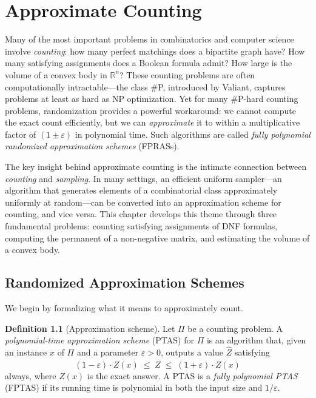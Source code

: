 \documentclass[twoside,12pt]{book}
\theoremstyle{plain}
\theoremstyle{definition}
\newtheorem{definition}[theorem]{Definition}
\theoremstyle{remark}
\begin{document}
\chapter{Approximate Counting}
\label{ch:approximate-counting}

Many of the most important problems in combinatorics and computer science involve \emph{counting}: how many perfect matchings does a bipartite graph have? How many satisfying assignments does a Boolean formula admit? How large is the volume of a convex body in $\mathbb{R}^n$? These counting problems are often computationally intractable---the class \#P, introduced by Valiant, captures problems at least as hard as NP optimization. Yet for many \#P-hard counting problems, randomization provides a powerful workaround: we cannot compute the exact count efficiently, but we can \emph{approximate} it to within a multiplicative factor of $(1 \pm \varepsilon)$ in polynomial time. Such algorithms are called \emph{fully polynomial randomized approximation schemes} (FPRASs).

The key insight behind approximate counting is the intimate connection between \emph{counting} and \emph{sampling}. In many settings, an efficient uniform sampler---an algorithm that generates elements of a combinatorial class approximately uniformly at random---can be converted into an approximation scheme for counting, and vice versa. This chapter develops this theme through three fundamental problems: counting satisfying assignments of DNF formulas, computing the permanent of a non-negative matrix, and estimating the volume of a convex body.

\section{Randomized Approximation Schemes}
\label{sec:approx-schemes}

We begin by formalizing what it means to approximately count.

\begin{definition}[Approximation scheme]
Let $\Pi$ be a counting problem. A \emph{polynomial-time approximation scheme} (PTAS) for $\Pi$ is an algorithm that, given an instance $x$ of $\Pi$ and a parameter $\varepsilon > 0$, outputs a value $\hat{Z}$ satisfying
\[
(1 - \varepsilon) \cdot Z(x) \;\leq\; \hat{Z} \;\leq\; (1 + \varepsilon) \cdot Z(x)
\]
always, where $Z(x)$ is the exact answer. A PTAS is a \emph{fully polynomial PTAS} (FPTAS) if its running time is polynomial in both the input size and $1/\varepsilon$.
\end{definition}
\end{document}
